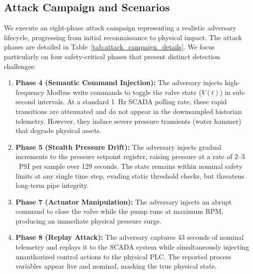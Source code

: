 \documentclass[journal,twoside,web]{ieeecolor}
\begin{document}
\subsection{Attack Campaign and Scenarios}
We execute an eight-phase attack campaign representing a realistic adversary lifecycle, progressing from initial reconnaissance to physical impact. The attack phases are detailed in Table~\ref{tab:attack_campaign_details}. We focus particularly on four safety-critical phases that present distinct detection challenges:
\begin{enumerate}
    \item \textbf{Phase 4 (Semantic Command Injection):} The adversary injects high-frequency Modbus write commands to toggle the valve state ($V(t)$) in sub-second intervals. At a standard 1~Hz SCADA polling rate, these rapid transitions are attenuated and do not appear in the downsampled historian telemetry. However, they induce severe pressure transients (water hammer) that degrade physical assets.
    \item \textbf{Phase 5 (Stealth Pressure Drift):} The adversary injects gradual increments to the pressure setpoint register, raising pressure at a rate of $2$--$3$~PSI per sample over 129 seconds. The state remains within nominal safety limits at any single time step, evading static threshold checks, but threatens long-term pipe integrity.
    \item \textbf{Phase 7 (Actuator Manipulation):} The adversary injects an abrupt command to close the valve while the pump runs at maximum RPM, producing an immediate physical pressure surge.
    \item \textbf{Phase 8 (Replay Attack):} The adversary captures 43 seconds of nominal telemetry and replays it to the SCADA system while simultaneously injecting unauthorized control actions to the physical PLC. The reported process variables appear live and nominal, masking the true physical state.
\end{enumerate}
\end{document}
